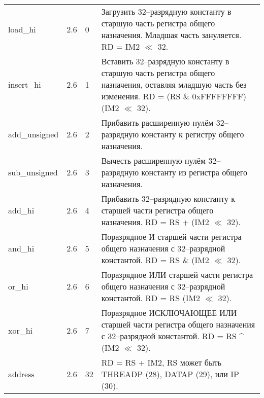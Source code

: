 \documentclass[forwardcom.tex]{subfiles}
\begin{document}
\begin{longtable} {|p{23mm}|p{15mm}|p{9mm}|p{99mm}|}
load\_hi          & 2.6   &  0 & Загрузить 32--разрядную константу в старшую часть регистра общего назначения. Младшая часть зануляется. RD = IM2 $\ll$ 32. \\
insert\_hi        & 2.6   &  1 & Вставить 32--разрядную константу в старшую часть регистра общего назначения, оставляя младшую часть без изменения. RD = (RS \& 0xFFFFFFFF) \textbar{} (IM2 $\ll$ 32). \\
add\_unsigned     & 2.6   &  2 & Прибавить расширенную нулём 32--разрядную константу к регистру общего назначения. \\
sub\_unsigned     & 2.6   &  3 & Вычесть расширенную нулём 32--разрядную константу из регистра общего назначения. \\
add\_hi           & 2.6   &  4 & Прибавить 32--разрядную константу к старшей части регистра общего назначения. RD = RS + (IM2 $\ll$ 32). \\
and\_hi           & 2.6   &  5 & Поразрядное И старшей части регистра общего назначения с 32--разрядной константой. RD = RS \& (IM2 $\ll$ 32). \\
or\_hi            & 2.6   &  6 & Поразрядное ИЛИ старшей части регистра общего назначения с 32--разрядной константой. RD = RS \textbar{} (IM2 $\ll$ 32). \\
xor\_hi           & 2.6   &  7 & Поразрядное ИСКЛЮЧАЮЩЕЕ ИЛИ старшей части регистра общего назначения с 32--разрядной константой. RD = RS \^{} (IM2 $\ll$ 32). \\
address           & 2.6   & 32 & RD = RS + IM2, RS может быть THREADP (28), DATAP (29), или IP (30). \\ \hline
\end{longtable}
\end{document}
